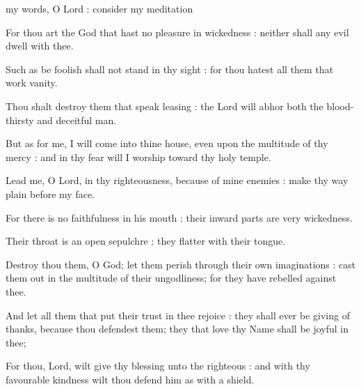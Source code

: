 
 my words, O Lord : consider my meditation\par
{}
For thou art the God that hast no pleasure in wickedness : neither shall any evil dwell with thee.\par
{}Such as be foolish shall not stand in thy sight : for thou hatest all them that work vanity.\par
{}Thou shalt destroy them that speak leasing : the Lord will abhor both the blood-thirsty and deceitful man.\par
{}But as for me, I will come into thine house, even upon the multitude of thy mercy : and in thy fear will I worship toward thy holy temple.\par
{}Lead me, O Lord, in thy righteousness, because of mine enemies : make thy way plain before my face.\par
{}For there is no faithfulness in his mouth : their inward parts are very wickedness.\par
{}Their throat is an open sepulchre : they flatter with their tongue.\par
{}Destroy thou them, O God; let them perish through their own imaginations : cast them out in the multitude of their ungodliness; for they have rebelled against thee.\par
{}And let all them that put their trust in thee rejoice : they shall ever be giving of thanks, because thou defendest them; they that love thy Name shall be joyful in thee;\par
{}For thou, Lord, wilt give thy blessing unto the righteous : and with thy favourable kindness wilt thou defend him as with a shield.\par



